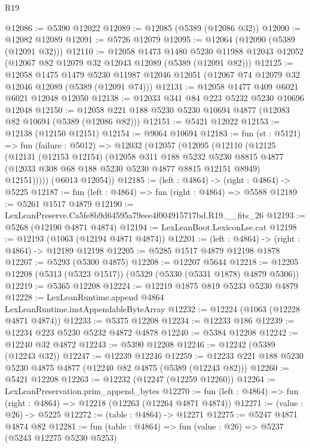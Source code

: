 \begin{lexlean}{R19}
\begin{coremodule}
@12086 := @5390 @12022
@12089 := @12085 (@5389 (@12086 @32))
@12090 := @12082 @12089
@12091 := @5726 @12079
@12095 := @12064 (@12090 (@5389 (@12091 @32)))
@12110 := @12058
    @1473
    @1480
    @5230
    @11988
    @12043
    @12052
    (@12067 @82 @12079 @32 @12043 @12089 (@5389 (@12091 @82)))
@12125 := @12058
    @1475
    @1479
    @5230
    @11987
    @12046
    @12051
    (@12067 @74 @12079 @32 @12046 @12089 (@5389 (@12091 @74)))
@12131 := @12058 @1477 @409 @6021 @6021 @12048 @12050
@12138 := @12033 @341 @84 @223 @5232 @5230 @10696 @12048
@12150 := @12058 @221 @188 @5230 @5230 @10694 @4877 (@12083 @82 @10694 (@5389 (@12086 @82)))
@12151 := @5421 @12022
@12153 := @12138 (@12150 @12151)
@12154 := @9064 @10694
@12183 := fun (st : @5121) =>
  fun (failure : @5012) =>
  @12032
    (@12057
      (@12095
        (@12110
          (@12125
            (@12131
              (@12153 @12154)
              (@12058
                @311
                @188
                @5232
                @5230
                @8815
                @4877
                (@12033 @308 @68 @188 @5230 @5230 @4877 @8815 @12151 @8949)
                @12151)))))
      (@6013 @12054))
@12185 := (left : @4864) -> (right : @4864) -> @5225
@12187 := fun (left : @4864) => fun (right : @4864) => @5588
@12189 := @5261 @1517 @4879
@12190 := LexLeanPreserve.Ca5fe8b9d64595a79eee4f004915717bd.R19.__fits_26
@12193 := @5268 (@12190 @4871 @4874)
@12194 := LexLeanBoot.LexiconLse.cat
@12198 := @12193 (@1063 (@12194 @4871 @4874))
@12201 := (left : @4864) -> (right : @4864) -> @12189 @12198
@12205 := @5285 @1517 @4879 @12198 @1878
@12207 := @5293 (@5300 @4875)
@12208 := @12207 @5644
@12218 := @12205 @12208 (@5313 (@5323 @1517)) (@5329 (@5330 (@5331 @1878) @4879 @5306))
@12219 := @5365 @12208
@12224 := @12219 @1875 @819 @5233 @5230 @4879
@12228 := LexLeanRuntime.append @4864 LexLeanRuntime.instAppendableByteArray
@12232 := @12224 (@1063 (@12228 @4871 @4874))
@12233 := @5375 @12208
@12234 := @12233 @186
@12239 := @12234 @223 @5230 @5232 @4872 @4878
@12240 := @5384 @12208
@12242 := @12240 @32 @4872
@12243 := @5390 @12208
@12246 := @12242 (@5389 (@12243 @32))
@12247 := @12239 @12246
@12259 := @12233 @221 @188 @5230 @5230 @4875 @4877 (@12240 @82 @4875 (@5389 (@12243 @82)))
@12260 := @5421 @12208
@12263 := @12232 (@12247 (@12259 @12260))
@12264 := LexLeanPreservation.prim_append_bytes
@12270 := fun (left : @4864) => fun (right : @4864) => @12218 (@12263 (@12264 @4871 @4874))
@12271 := (value : @26) -> @5225
@12272 := (table : @4864) -> @12271
@12275 := @5247 @4871 @4874 @82
@12281 := fun (table : @4864) => fun (value : @26) => @5237 (@5243 @12275 @5230 @5253)

\end{coremodule}
\end{lexlean}
